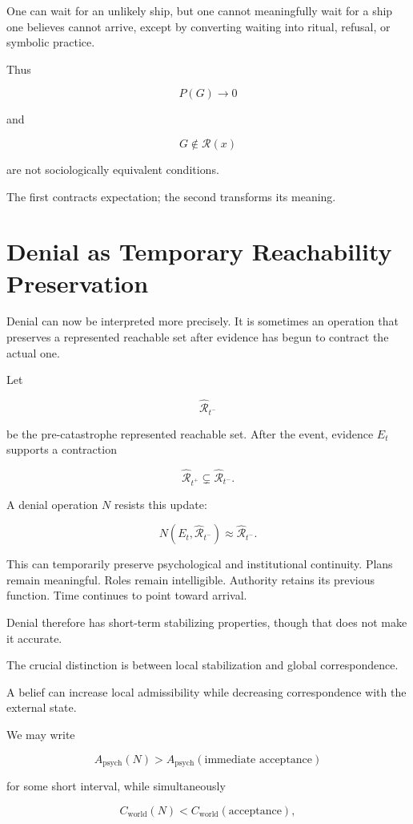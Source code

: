 \documentclass[11pt,oneside]{book}
\theoremstyle{definition}
\theoremstyle{remark}
\newcommand{\R}{\mathcal{R}}
\begin{document}
One can wait for an unlikely ship, but one cannot meaningfully wait for a ship one believes cannot arrive, except by converting waiting into ritual, refusal, or symbolic practice.

Thus

\[
P(G)\rightarrow0
\]

and

\[
G\notin\R(x)
\]

are not sociologically equivalent conditions.

The first contracts expectation; the second transforms its meaning.

\section{Denial as Temporary Reachability Preservation}

Denial can now be interpreted more precisely. It is sometimes an operation that preserves a represented reachable set after evidence has begun to contract the actual one.

Let

\[
\widehat{\R}_{t^-}
\]

be the pre-catastrophe represented reachable set. After the event, evidence \(E_t\) supports a contraction

\[
\widehat{\R}_{t^+}
\subsetneq
\widehat{\R}_{t^-}.
\]

A denial operation \(N\) resists this update:

\[
N(E_t,\widehat{\R}_{t^-})
\approx
\widehat{\R}_{t^-}.
\]

This can temporarily preserve psychological and institutional continuity. Plans remain meaningful. Roles remain intelligible. Authority retains its previous function. Time continues to point toward arrival.

Denial therefore has short-term stabilizing properties, though that does not make it accurate.

The crucial distinction is between local stabilization and global correspondence.

A belief can increase local admissibility while decreasing correspondence with the external state.

We may write

\[
A_{\mathrm{psych}}(N)>A_{\mathrm{psych}}(\text{immediate acceptance})
\]

for some short interval, while simultaneously

\[
C_{\mathrm{world}}(N)
<
C_{\mathrm{world}}(\text{acceptance}),
\]
\end{document}
